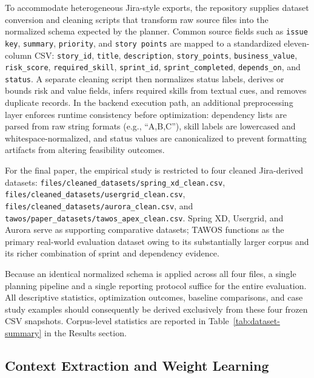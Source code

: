 \documentclass[conference]{IEEEtran}
\begin{document}
To accommodate heterogeneous Jira-style exports, the repository supplies dataset
conversion and cleaning scripts that transform raw source files into the normalized
schema expected by the planner.
Common source fields such as \texttt{issue key}, \texttt{summary}, \texttt{priority},
and \texttt{story points} are mapped to a standardized eleven-column CSV:
\texttt{story\_id}, \texttt{title}, \texttt{description}, \texttt{story\_points},
\texttt{business\_value}, \texttt{risk\_score}, \texttt{required\_skill},
\texttt{sprint\_id}, \texttt{sprint\_completed}, \texttt{depends\_on}, and
\texttt{status}.
A separate cleaning script then normalizes status labels, derives or bounds risk and
value fields, infers required skills from textual cues, and removes duplicate
records. In the backend execution path, an additional preprocessing layer enforces
runtime consistency before optimization: dependency lists are parsed from raw string
formats (e.g., ``A,B,C''), skill labels are lowercased and whitespace-normalized,
and status values are canonicalized to prevent formatting artifacts from altering
feasibility outcomes.

For the final paper, the empirical study is restricted to four cleaned
Jira-derived datasets:
\texttt{files/cleaned\_datasets/spring\_xd\_clean.csv},
\texttt{files/cleaned\_datasets/usergrid\_clean.csv},
\texttt{files/cleaned\_datasets/aurora\_clean.csv}, and
\texttt{tawos/paper\_datasets/tawos\_apex\_clean.csv}.
Spring XD, Usergrid, and Aurora serve as supporting comparative datasets; TAWOS
functions as the primary real-world evaluation dataset owing to its substantially
larger corpus and its richer combination of sprint and dependency evidence.

Because an identical normalized schema is applied across all four files, a single
planning pipeline and a single reporting protocol suffice for the entire evaluation.
All descriptive statistics, optimization outcomes, baseline comparisons, and case
study examples should consequently be derived exclusively from these four frozen CSV
snapshots.
Corpus-level statistics are reported in Table~\ref{tab:dataset-summary} in the
Results section.

\subsection{Context Extraction and Weight Learning}
\end{document}

